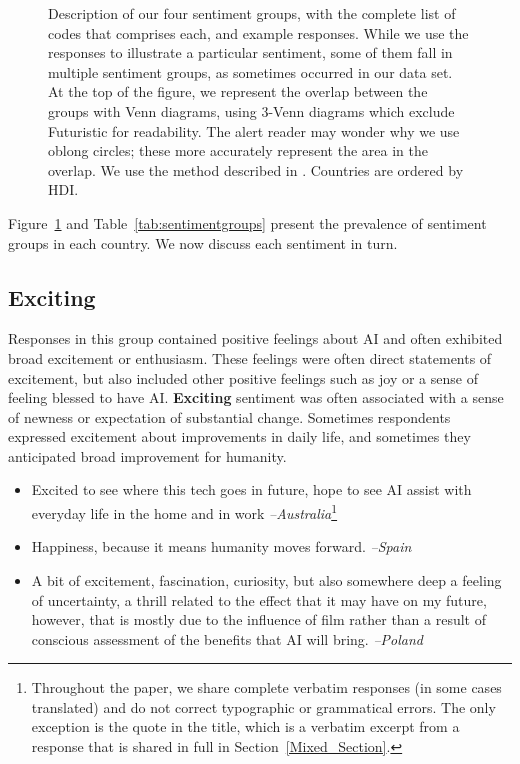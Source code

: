 \documentclass[11pt]{article} %
\newcommand\aff[1]{\textcolor{darkplum}{{\emph{--#1}}}}
\newenvironment{lq2}
{ \vspace{-3pt}
  \begin{itemize}[leftmargin = 4.0em, rightmargin=5.0em, label={}]
    \fontsize{10pt}{10.7pt}\selectfont
    \setlength{\itemsep}{3pt}
    \setlength{\parskip}{2.5pt}
    \setlength{\parsep}{3pt}     }
{ \end{itemize} \vspace{1pt}  }
\def\Exciting/{{\fontfamily{lmss}\selectfont\textbf{Exciting}}}  \def\Useful/{{\fontfamily{lmss}\selectfont\textbf{Useful}}}
\begin{document}
\begin{figure}[p]
\begin{multicols}{4}
\end{multicols}

  \vspace{-0.4cm}
  \caption{\small{Description of our four sentiment groups, with the complete list of codes that comprises each, and example responses. While we use the responses to illustrate a particular sentiment, some of them fall in multiple sentiment groups, as sometimes occurred in our data set. At the top of the figure, we represent the overlap between the groups with Venn diagrams, using 3-Venn diagrams which exclude Futuristic for readability. The alert reader may wonder why we use oblong circles; these more accurately represent the area in the overlap. We use the method described in \protect\cite{micallef2014eulerape}. Countries are ordered by HDI.}}
  \label{fig:venn}
\end{figure}


Figure~\ref{fig:venn} and Table~\ref{tab:sentimentgroups} present the prevalence of sentiment groups in each country. We now discuss each sentiment in turn.


\subsection{Exciting}

Responses in this group contained positive feelings about AI and often exhibited broad excitement or enthusiasm. These feelings were often direct statements of excitement, but also included other positive feelings such as joy or a sense of feeling blessed to have AI. \Exciting/ sentiment was often associated with a sense of newness or expectation of substantial change. Sometimes respondents expressed excitement about improvements in daily life, and sometimes they anticipated broad improvement for humanity.

\begin{lq2}
\item Excited to see where this tech goes in future, hope to see AI assist with everyday life in the home and in work \aff{Australia}\footnote{Throughout the paper, we share complete verbatim responses (in some cases translated) and do not correct typographic or grammatical errors. The only exception is the quote in the title, which is a verbatim excerpt from a response that is shared in full in Section~\ref{Mixed_Section}.}
\item Happiness, because it means humanity moves forward. \aff{Spain}
\item A bit of excitement, fascination, curiosity, but also somewhere deep a feeling of uncertainty, a thrill related to the effect that it may have on my future, however, that is mostly due to the influence of film rather than a result of conscious assessment of the benefits that AI will bring. \aff{Poland}
\end{lq2}
\end{document}
